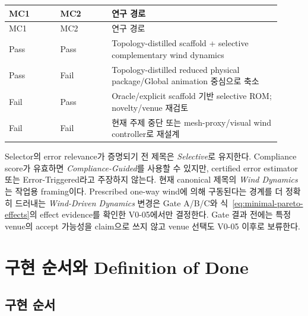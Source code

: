 \documentclass[11pt]{article}
\begin{document}
\begin{longtable}{L{0.17\linewidth}L{0.17\linewidth}L{0.57\linewidth}}
\toprule
MC1 & MC2 & 연구 경로\\
\midrule
\endfirsthead
\toprule
MC1 & MC2 & 연구 경로\\
\midrule
\endhead
Pass & Pass & Topology-distilled scaffold + selective complementary wind dynamics\\
Pass & Fail & Topology-distilled reduced physical package/Global animation 중심으로 축소\\
Fail & Pass & Oracle/explicit scaffold 기반 selective ROM; novelty/venue 재검토\\
Fail & Fail & 현재 주제 중단 또는 mesh-proxy/visual wind controller로 재설계\\
\bottomrule
\end{longtable}

Selector의 error relevance가 증명되기 전 제목은 \emph{Selective}로 유지한다.
Compliance score가 유효하면 \emph{Compliance-Guided}를 사용할 수 있지만,
certified error estimator 또는 Error-Triggered라고 주장하지 않는다.
현재 canonical 제목의 \emph{Wind Dynamics}는 작업용 framing이다. Prescribed one-way wind에 의해
구동된다는 경계를 더 정확히 드러내는 \emph{Wind-Driven Dynamics} 변경은 Gate A/B/C와
식~\eqref{eq:minimal-pareto-effects}의 effect evidence를 확인한 V0-05에서만 결정한다.
Gate 결과 전에는 특정 venue의 accept 가능성을 claim으로 쓰지 않고 venue 선택도 V0-05 이후로 보류한다.

\section{구현 순서와 Definition of Done}

\subsection{구현 순서}
\end{document}
